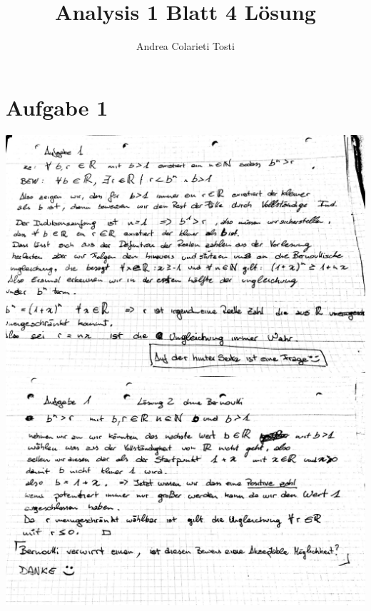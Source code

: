 \documentclass[12pt,a4paper,landscape]{article}
\author{Andrea Colarieti Tosti}
\title{Analysis 1 Blatt 4 Lösung}
\begin{document}
\maketitle \newpage


\section{Aufgabe 1}
\includegraphics[scale=0.2]{AB4_1.jpg} \newpage
\includegraphics[scale=0.2]{AB4_2.jpg} 
\end{document}
